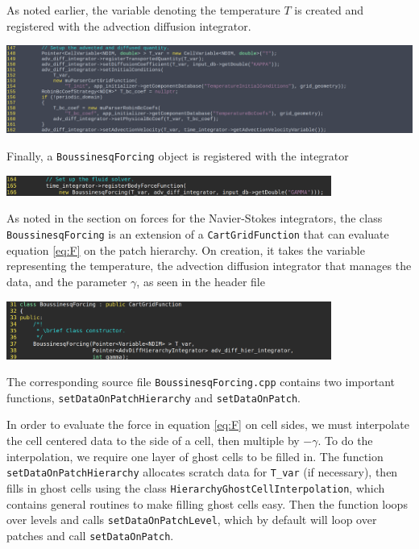 \documentclass{article}
\begin{document}
As noted earlier, the variable denoting the temperature $T$ is created and registered with the advection diffusion integrator.
\begin{center}
\includegraphics[width=\textwidth]{Graphs/NS-ex5/advected_quantity.png}
\end{center}

Finally, a \verb|BoussinesqForcing| object is registered with the integrator
\begin{center}
\includegraphics[width=0.8\textwidth]{Graphs/NS-ex5/source_registerForce.png}
\end{center}

As noted in the section on forces for the Navier-Stokes integrators, the class \verb|BoussinesqForcing| is an extension of a \verb|CartGridFunction| that can evaluate equation \eqref{eq:F} on the patch hierarchy. On creation, it takes the variable representing the temperature, the advection diffusion integrator that manages the data, and the parameter $\gamma$, as seen in the header file
\begin{center}
\includegraphics[width=0.8\textwidth]{Graphs/NS-ex5/Boussinesq_header_constructor.png}
\end{center}
The corresponding source file \verb|BoussinesqForcing.cpp| contains two important functions, \verb|setDataOnPatchHierarchy| and \verb|setDataOnPatch|.

In order to evaluate the force in equation \eqref{eq:F} on cell sides, we must interpolate the cell centered data to the side of a cell, then multiple by $-\gamma$. To do the interpolation, we require one layer of ghost cells to be filled in. The function \verb|setDataOnPatchHierarchy| allocates scratch data for \verb|T_var| (if necessary), then fills in ghost cells using the class \verb|HierarchyGhostCellInterpolation|, which contains general routines to make filling ghost cells easy. Then the function loops over levels and calls \verb|setDataOnPatchLevel|, which by default will loop over patches and call \verb|setDataOnPatch|.
\end{document}
